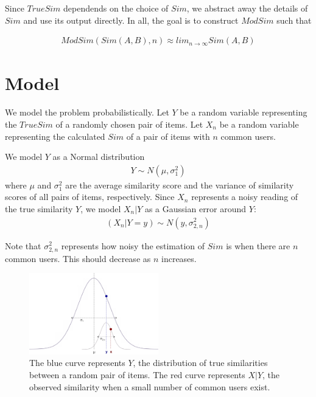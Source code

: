 \documentclass[11pt]{article}
\begin{document}
Since $TrueSim$ dependends on the choice of $Sim$, we abstract away the details
of $Sim$ and use its output directly. In all, the goal is to construct $ModSim$
such that

\begin{align}
ModSim(Sim(A, B), n) \approx lim_{n\to\infty}Sim(A, B)
\end{align}

\section*{Model}

We model the problem probabilistically. Let $Y$ be a random variable
representing the $TrueSim$ of a randomly chosen pair of items. Let $X_n$ be a
random variable representing the calculated $Sim$ of a pair of items with $n$
common users.

We model $Y$ as a Normal distribution 
\begin{align}
Y \sim N(\mu, \sigma_{1}^2)
\end{align}
where $\mu$ and $\sigma_{1}^2$ are the average similarity score and the variance
of similarity scores of all pairs of items, respectively. Since $X_n$ represents
a noisy reading of the true similarity $Y$, we model $X_n | Y$ as a Gaussian
error around $Y$:
\begin{align}
(X_n | Y=y) \sim N(y, \sigma_{2, n}^2)
\end{align}

Note that $\sigma_{2, n}^2$ represents how noisy the estimation of $Sim$ is when
there are $n$ common users. This should decrease as $n$ increases.

\begin{figure}[!htbp]
    \centering
    \includegraphics[width=0.5\textwidth]{twonormals.png}
	\caption{The blue curve represents $Y$, the distribution of true
    similarities between a random pair of items. The red curve represents $X|Y$,
    the observed similarity when a small number of common users exist.}
    \label{fig:two_normals}
\end{figure}
\end{document}
